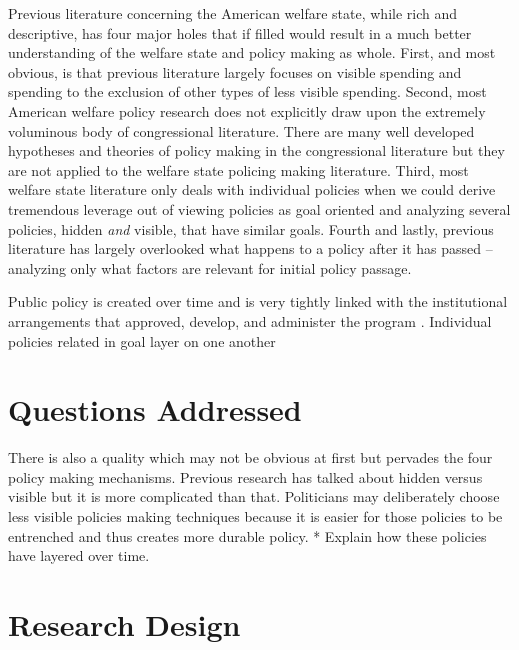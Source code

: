 \documentclass[12pt]{article}
\begin{document}
Previous literature concerning the American welfare state, while rich and descriptive, has four major holes that if filled would result in a much better understanding of the welfare state and policy making as whole. First, and most obvious, is that previous literature largely focuses on visible spending and spending to the exclusion of other types of less visible spending. Second, most American welfare policy research does not explicitly draw upon the extremely voluminous body of congressional literature. There are many well developed hypotheses and theories of policy making in the congressional literature but they are not applied to the welfare state policing making literature. Third, most welfare state literature only deals with individual policies when we could derive tremendous leverage out of viewing policies as goal oriented and analyzing several policies, hidden \emph{and} visible, that have similar goals. Fourth and lastly, previous literature has largely overlooked what happens to a policy after it has passed -- analyzing only what factors are relevant for initial policy passage.

Public policy is created over time and is very tightly linked with the institutional arrangements that approved, develop, and administer the program \citep{pierson2004b}. Individual policies related in goal layer on one another 
 
\section{Questions Addressed}


\citep{elving1996}


There is also a quality which may not be obvious at first but pervades the four policy making mechanisms. Previous research has talked about hidden versus visible but it is more complicated than that. Politicians may deliberately choose less visible policies making techniques because it is easier for those policies to be entrenched and thus creates more durable policy.
		* Explain how these policies have layered over time.


\section{Research Design}





\newpage
    {}


\end{document}
